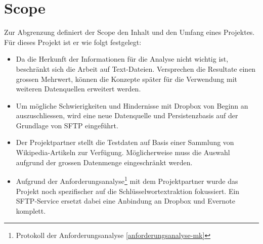 \section{Scope}\label{sec:scope} 
Zur Abgrenzung definiert der Scope den Inhalt und den Umfang eines Projektes. Für dieses Projekt ist er wie folgt festgelegt:
\begin{itemize}
    \item Da die Herkunft der Informationen für die Analyse nicht wichtig ist, beschränkt sich die Arbeit auf Text-Dateien. Versprechen die Resultate einen grossen Mehrwert, können die Konzepte spä\-ter für die Verwendung mit weiteren Datenquellen erweitert werden.
    \item Um mögliche Schwierigkeiten und Hindernisse mit Dropbox von Beginn an auszuschliessen, wird eine neue Datenquelle und Persistenzbasis auf der Grundlage von \gls{SFTP} eingeführt.
    \item Der Projektpartner stellt die Testdaten auf Basis einer Sammlung von Wikipedia-Artikeln zur Verfügung. Möglicherweise muss die Auswahl aufgrund der grossen Datenmenge ein\-ge\-schränkt werden.
    \item Aufgrund der Anforderungsanalyse\footnote{{Protokoll der Anforderungsanalyse \autoref{anforderungsanalyse-mk}}} mit dem Projektpartner wurde das Projekt noch spezifischer auf die Schlüss\-el\-wort\-ex\-traktion fokussiert. Ein \gls{SFTP}-Service ersetzt dabei eine Anbindung an Dropbox und Evernote komplett.
\end{itemize}

